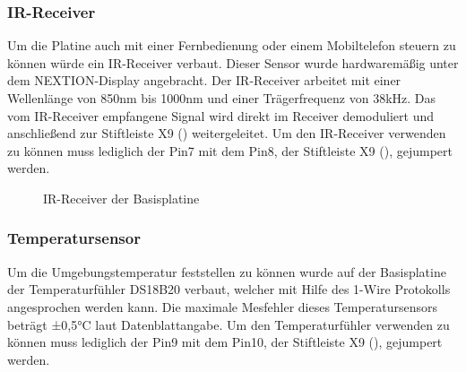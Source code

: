 \subsubsection{IR-Receiver}
Um die Platine auch mit einer Fernbedienung oder einem Mobiltelefon steuern zu können würde ein IR-Receiver verbaut. Dieser Sensor wurde hardwaremäßig unter dem NEXTION-Display angebracht. Der IR-Receiver arbeitet mit einer Wellenlänge von 850nm bis 1000nm und einer Trägerfrequenz von 38kHz. Das vom IR-Receiver empfangene Signal wird direkt im Receiver demoduliert und anschließend zur Stiftleiste X9 () weitergeleitet. Um den IR-Receiver verwenden zu können muss lediglich der Pin7 mit dem Pin8, der Stiftleiste X9 (), gejumpert werden.

\begin{figure}[H]
    \centering
    \qquad
    \qquad
    \caption[IR-Receiver der Basisplatine]{IR-Receiver der \gls{Basisplatine}}
    \label{fig:basisplatine-ir}
\end{figure}

\subsubsection{Temperatursensor}
Um die Umgebungstemperatur feststellen zu können wurde auf der Basisplatine der Temperaturfühler DS18B20 verbaut, welcher mit Hilfe des 1-Wire Protokolls angesprochen werden kann. Die maximale Mesfehler dieses Temperatursensors beträgt ±0,5°C laut Datenblattangabe. Um den Temperaturfühler verwenden zu können muss lediglich der Pin9 mit dem Pin10, der Stiftleiste X9 (), gejumpert werden. 

